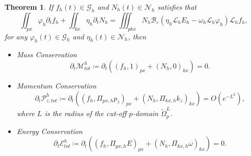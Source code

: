 \documentclass{article}
\newtheorem{theorem}{Theorem}
\numberwithin{equation}{section}
\begin{document}
\begin{theorem}
    If $f_{h}(t)\in\mathcal{G}_{h}$ and $N_{h}(t)\in\mathcal{N}_{h}$ satisfies that
    \begin{equation}\label{semi-discrete}
        \iint_{px}\varphi_{h}\partial_{t}f_{h}+\iint_{kx}\eta_{h}\partial_{t}N_{h}=\iiint_{pkx}N_{h}\mathcal{B}_{\varepsilon}\left(\eta_{h}\mathcal{L}_{h}E_{h}-\omega_{h}\mathcal{L}_{h}\varphi_{h}\right)\mathcal{L}_{h}f_{h},
    \end{equation}
    for any $\varphi_{h}(t)\in\mathcal{G}_{h}$ and $\eta_{h}(t)\in\mathcal{N}_{h}$, then

    \begin{itemize}
    \item Mass Conservation
    \begin{equation*}
        \partial_{t}\mathcal{M}^{h}_{tot}\coloneqq \partial_{t}\left((f_{h},1)_{px}+(N_{h},0)_{kx}\right)=0.
    \end{equation*}
    
    \item Momentum Conservation
    \begin{equation*}
        \partial_{t}\mathcal{P}^{h}_{z,tot} \coloneqq \partial_{t}\left((f_{h},\Pi_{px,h} p_{z})_{px}+(N_{h},\Pi_{kx,h} k_{z})_{kx}\right) = O(e^{-L^{2}}),
    \end{equation*}
    where $L$ is the radius of the cut-off $p$-domain $\tilde{\Omega}_{p}^{L}$.
    \item Energy Conservation
    \begin{equation*}
        \partial_{t}\mathcal{E}^{h}_{tot} \coloneqq \partial_{t}\left((f_{h},\Pi_{px,h}E)_{px}+(N_{h},\Pi_{kx,h}\omega)_{kx}\right)=0.
    \end{equation*}
    
\end{itemize}
\end{theorem}
\end{document}
